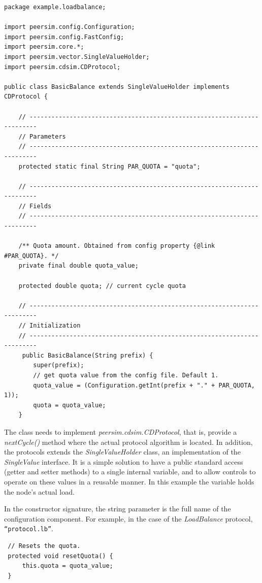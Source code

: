 \documentclass[a4paper,11pt]{article}
\begin{document}
\footnotesize
\begin{verbatim}
package example.loadbalance;

import peersim.config.Configuration;
import peersim.config.FastConfig;
import peersim.core.*;
import peersim.vector.SingleValueHolder;
import peersim.cdsim.CDProtocol;

public class BasicBalance extends SingleValueHolder implements CDProtocol {

    // ------------------------------------------------------------------------
    // Parameters
    // ------------------------------------------------------------------------
    protected static final String PAR_QUOTA = "quota";

    // ------------------------------------------------------------------------
    // Fields
    // ------------------------------------------------------------------------

    /** Quota amount. Obtained from config property {@link #PAR_QUOTA}. */
    private final double quota_value;

    protected double quota; // current cycle quota

    // ------------------------------------------------------------------------
    // Initialization
    // ------------------------------------------------------------------------
     public BasicBalance(String prefix) {
        super(prefix);
        // get quota value from the config file. Default 1.
        quota_value = (Configuration.getInt(prefix + "." + PAR_QUOTA, 1));
        quota = quota_value;
    }
\end{verbatim}
\normalsize

The class needs to
implement \emph{peersim.cdsim.CDProtocol}, that is, provide a
\emph{nextCycle()} method 
where the actual protocol algorithm is located.
In addition, the protocols extends the \emph{SingleValueHolder} class,
an implementation of the \emph{SingleValue} interface. It is a simple
solution to have a public standard access (getter and setter methods)
to a single internal variable, and to allow controls to operate on
these values in a reusable manner. In this example the variable holds the
node's actual load.

In the constructor signature, the string parameter 
is the full name of the configuration component.
For example, in the case of the \emph{LoadBalance} protocol,
\texttt{``protocol.lb''}.

\footnotesize
\begin{verbatim}
 // Resets the quota. 
 protected void resetQuota() {
     this.quota = quota_value;
 }
\end{verbatim}
\normalsize
\end{document}
